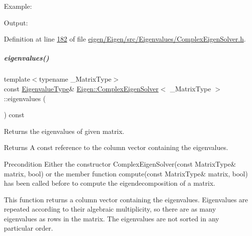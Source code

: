 Example\+: 
\begin{DoxyCodeInclude}
\end{DoxyCodeInclude}
 Output\+: 
\begin{DoxyVerbInclude}
\end{DoxyVerbInclude}
 

Definition at line \hyperlink{eigen_2_eigen_2src_2_eigenvalues_2_complex_eigen_solver_8h_source_l00182}{182} of file \hyperlink{eigen_2_eigen_2src_2_eigenvalues_2_complex_eigen_solver_8h_source}{eigen/\+Eigen/src/\+Eigenvalues/\+Complex\+Eigen\+Solver.\+h}.

\mbox{\label{group___eigenvalues___module_a10c25c7620e7faedcd39991cce3a757b}} 
\subparagraph{\texorpdfstring{eigenvalues()}{eigenvalues()}\hspace{0.1cm}{\footnotesize\ttfamily [2/2]}}
{\footnotesize\ttfamily template$<$typename \+\_\+\+Matrix\+Type$>$ \\
const \hyperlink{group___eigenvalues___module_ad3a663b1ff5200a098dabbbf9b7162b1}{Eigenvalue\+Type}\& \hyperlink{group___eigenvalues___module_class_eigen_1_1_complex_eigen_solver}{Eigen\+::\+Complex\+Eigen\+Solver}$<$ \+\_\+\+Matrix\+Type $>$\+::eigenvalues (\begin{DoxyParamCaption}{ }\end{DoxyParamCaption}) const\hspace{0.3cm}{\ttfamily [inline]}}



Returns the eigenvalues of given matrix. 

\begin{DoxyReturn}{Returns}
A const reference to the column vector containing the eigenvalues.
\end{DoxyReturn}
\begin{DoxyPrecond}{Precondition}
Either the constructor Complex\+Eigen\+Solver(const Matrix\+Type\& matrix, bool) or the member function compute(const Matrix\+Type\& matrix, bool) has been called before to compute the eigendecomposition of a matrix.
\end{DoxyPrecond}
This function returns a column vector containing the eigenvalues. Eigenvalues are repeated according to their algebraic multiplicity, so there are as many eigenvalues as rows in the matrix. The eigenvalues are not sorted in any particular order.

